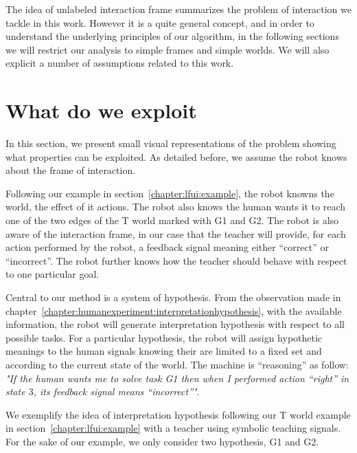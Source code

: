 \transition

The idea of unlabeled interaction frame summarizes the problem of interaction we tackle in this work. However it is a quite general concept, and in order to understand the underlying principles of our algorithm, in the following sections we will restrict our analysis to simple frames and simple worlds. We will also explicit a number of assumptions related to this work.

\section{What do we exploit}

In this section, we present small visual representations of the problem showing what properties can be exploited. As detailed before, we assume the robot knows about the frame of interaction. 

Following our example in section~\ref{chapter:lfui:example}, the robot knowns the world, the effect of it actions. The robot also knows the human wants it to reach one of the two edges of the T world marked with G1 and G2. The robot is also aware of the interaction frame, in our case that the teacher will provide, for each action performed by the robot, a feedback signal meaning either ``correct'' or ``incorrect''. The robot further knows how the teacher should behave with respect to one particular goal.

Central to our method is a system of hypothesis. From the observation made in chapter~\ref{chapter:humanexperiment:interpretationhypothesis}, with the available information, the robot will generate interpretation hypothesis with respect to all possible tasks. For a particular hypothesis, the robot will assign hypothetic meanings to the human signals knowing their are limited to a fixed set and according to the current state of the world. The machine is ``reasoning'' as follow: \emph{"If the human wants me to solve task G1 then when I performed action ``right'' in state $3$, its feedback signal means ``incorrect''"}. 

We exemplify the idea of interpretation hypothesis following our T world example in section~\ref{chapter:lfui:example} with a teacher using symbolic teaching signals. For the sake of our example, we only consider two hypothesis, G1 and G2.


